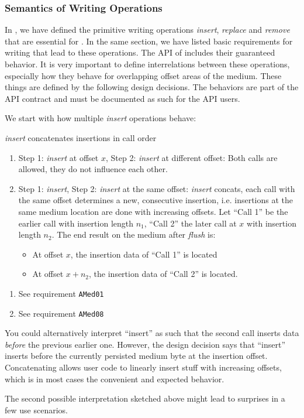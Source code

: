
\subsubsection{Semantics of Writing Operations}
\label{sec:SemantikSchreib}

In , we have defined the primitive writing operations \emph{insert}, \emph{replace} and \emph{remove} that are essential for \COMPmedia{}. In the same section, we have listed basic requirements for writing that lead to these operations. The API of \COMPmedia{} includes their guaranteed behavior. It is very important to define interrelations between these operations, especially how they behave for overlapping offset areas of the medium. These things are defined by the following design decisions. The behaviors are part of the API contract and must be documented as such for the API users.

We start with how multiple \emph{insert} operations behave:

{%
\emph{insert} concatenates insertions in call order
}
{%
\begin{enumerate}
\item Step 1: \emph{insert} at offset $x$, Step 2: \emph{insert} at different offset:  Both calls are allowed, they do not influence each other.
\item Step 1: \emph{insert}, Step 2: \emph{insert} at the same offset: \emph{insert} concats, each call with the same offset determines a new, consecutive insertion, i.e. insertions at the same medium location are done with increasing offsets. Let ``Call 1'' be the earlier call with insertion length $n_1$, ``Call 2'' the later call at $x$ with insertion length $n_2$. The end result on the medium after \emph{flush} is:
\begin{itemize}
\item At offset $x$, the insertion data of ``Call 1'' is located
\item At offset $x+n_2$, the insertion data of ``Call 2'' is located.
\end{itemize}
\end{enumerate}
}
{%
\begin{enumerate}
\item See requirement \texttt{AMed01}
\item See requirement \texttt{AMed08}
\end{enumerate}

You could alternatively interpret ``insert'' as such that the second call inserts data \emph{before} the previous earlier one. However, the design decision says that ``insert'' inserts before the currently persisted medium byte at the insertion offset. Concatenating allows user code to linearly insert stuff with increasing offsets, which is in most cases the convenient and expected behavior.
}
{%
The second possible interpretation sketched above might lead to surprises in a few use scenarios.
}


